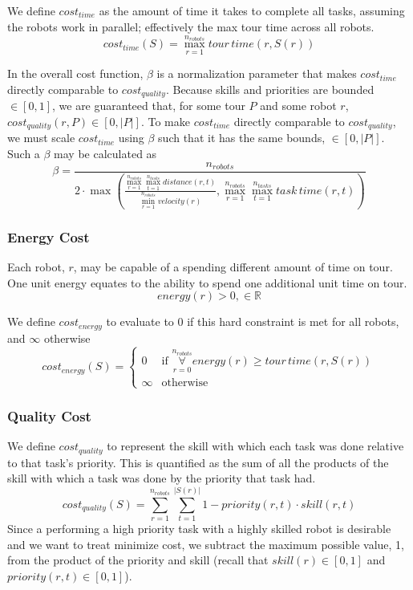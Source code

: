 \documentclass[a4paper]{article}
\begin{document}
We define $\mathit{cost}_\mathit{time}$ as the amount of time it takes to complete all tasks, assuming the robots work in parallel; effectively the max tour time across all robots.
$$
\mathit{cost}_\mathit{time}(S) =
  \max_{r=1}^{n_\mathit{robots}}
  \mathit{tour \, time}(r, S(r))
$$

In the overall cost function, $\beta$ is a normalization parameter that makes $\mathit{cost}_\mathit{time}$ directly comparable to $\mathit{cost}_\mathit{quality}$. Because skills and priorities are bounded $\in [0, 1]$, we are guaranteed that, for some tour $P$ and some robot $r$, $\mathit{cost}_\mathit{quality}(r, P) \in [0, |P|]$. To make $\mathit{cost}_\mathit{time}$ directly comparable to $\mathit{cost}_\mathit{quality}$, we must scale $\mathit{cost}_\mathit{time}$ using $\beta$ such that it has the same bounds, $\in [0, |P|]$. Such a $\beta$ may be calculated as
$$
\beta =
    \frac
      {n_\textit{robots}}
      {
        2 \cdot
        \max \left(
          \frac
            { \max\limits_{r=1}^{n_\mathit{robots}} \max\limits_{t=1}^{n_\mathit{tasks}} \mathit{distance}(r, t) }
            { \min\limits_{r=1}^{n_\mathit{robots}} \mathit{velocity}(r) },
          \max\limits_{r=1}^{n_\mathit{robots}} \max\limits_{t=1}^{n_\mathit{tasks}} \mathit{task \, time}(r, t)
        \right)
      }
$$

\subsubsection{Energy Cost}

Each robot, $r$, may be capable of a spending different amount of time on tour. One unit energy equates to the ability to spend one additional unit time on tour.
$$\mathit{energy}(r) > 0, \in \mathbb{R}$$

We define $\mathit{cost}_\mathit{energy}$ to evaluate to 0 if this hard constraint is met for all robots, and $\infty$ otherwise
$$
\mathit{cost}_\mathit{energy}(S) = \begin{cases}
0 & \text{if } \mathop{\forall}\limits_{r=0}^{n_\mathit{robots}} \mathit{energy}(r) \geq \mathit{tour \, time}(r, S(r)) \\
\infty & \text{otherwise}
\end{cases}
$$

\subsubsection{Quality Cost}

We define $\mathit{cost}_\mathit{quality}$ to represent the skill with which each task was done relative to that task's priority. This is quantified as the sum of all the products of the skill with which a task was done by the priority that task had.
$$
\mathit{cost}_\mathit{quality}(S) =
  \sum^{n_\mathit{robots}}_{r=1}
  \sum^{|S(r)|}_{t=1}
  1 - \mathit{priority}(r, t) \cdot \mathit{skill}(r, t)
$$
Since a performing a high priority task with a highly skilled robot is desirable and we want to treat minimize cost, we subtract the maximum possible value, 1, from the product of the priority and skill (recall that $\mathit{skill}(r) \in [0, 1]$ and $\mathit{priority}(r, t) \in [0, 1]$).
\end{document}
